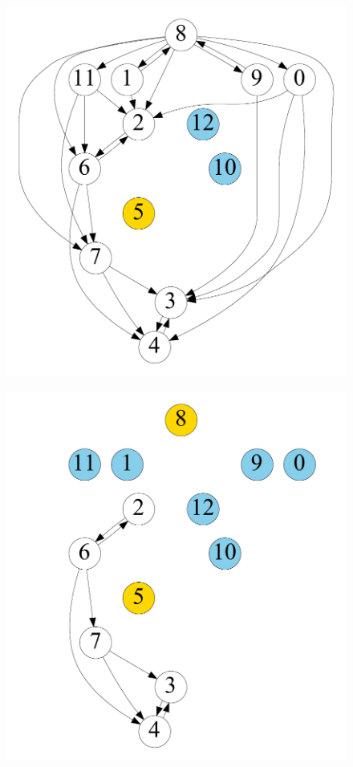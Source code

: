 \begin{figure}[t]
\begin{minipage}[b]{0.19\linewidth}
		{\includegraphics[width=\textwidth]{./alg_fig/simple-g2}}
	\end{minipage}
	\begin{minipage}[b]{0.19\linewidth}
		\centering
		{\includegraphics[width=\textwidth]{./alg_fig/simple-g4}}

\end{minipage}
\end{figure}
